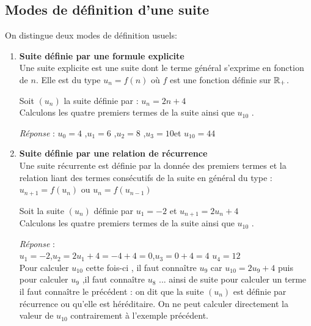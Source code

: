 \subsection*{Modes de définition d'une suite} 
 On distingue deux modes de définition usuels:
 \begin{enumerate}
  \item {\textbf{\color{blue} Suite définie par une formule explicite} }\\ 
Une suite explicite est une suite dont le terme général s'exprime en fonction \\de $n $. Elle est du type $ u_{n} = f (n) $ où $f$ est une fonction définie sur  $ \mathbb{R}_+ $.

\begin{example}
Soit $ (u_{n}) $ la suite définie par :  $ u_{n} = 2n + 4 $ \\
 Calculons les quatre premiers termes de la suite ainsi que $ u_{10} $ .
 \end{example}
 \textsl{Réponse} :
 $ u_{0}=  4 $ ,\quad $ u_{1} =  6 $ ,\quad $ u_{2} =  8 $ ,\quad  $ u_{3}=  10 $\quad et \quad $ u_{10} =  44 $
  

 \item { \textbf{\color{blue} Suite définie  par une relation de récurrence }}\\ 
 Une suite récurrente est définie par la donnée des premiers termes et la relation liant des termes consécutifs de la suite en général du type :\\$ u_{n+1} = f(u_{n}) $ ou $ u_{n} = f(u_{n-1}) $
     
     \begin{example}
     
      Soit la suite $ (u_{n})$ définie par $ u_{1}=-2 $ et $ u_{n+1} = 2u_{n}+4 $\\
Calculons les quatre premiers termes de la suite ainsi que $ u_{10} $ .
 \end{example}
  \textsl{Réponse }: \\
  $ u_{1}=  -2 $,\quad  $ u_{2}= 2u_{1}+4= -4+4=0 $,\quad $ u_{3} =  0+4= 4 $ \quad $ u_{4} =  12 $ \\
  Pour calculer  $ u_{10} $ cette fois-ci , il faut connaître $ u_{9} $ car $ u_{10}=2u_{9}+4 $ puis pour calculer $ u_{9} $ ,il faut connaître $ u_{8} $ ... ainsi de suite pour calculer un terme il faut connaître le précédent : on dit que la suite  $ (u_{n})$ est définie par récurrence ou qu'elle est héréditaire. On ne peut calculer directement la valeur de  $ u_{10} $ contrairement à l'exemple précédent.
 

\end{enumerate}
